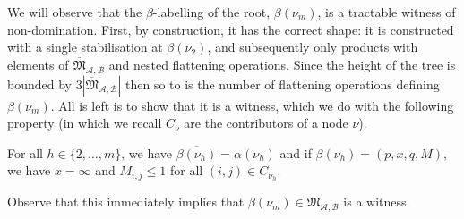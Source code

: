 \documentclass{lmcs}
\theoremstyle{remark}
\newcommand{\ideal}{\mathfrak{M}}
\newcommand{\autA}{\mathcal{A}}
\newcommand{\autB}{\mathcal{B}}
\theoremstyle{remark}
\begin{document}
We will observe that the $\beta$-labelling of the root, $\beta(\nu_m)$, is a tractable witness of non-domination. First, by construction, it has the correct shape: it is constructed with a single stabilisation at $\beta(\nu_2)$, and subsequently only products with elements of $\overline{\ideal}_{\autA,\autB}$ and nested flattening operations. Since the height of the tree is bounded by $3|\overline{\ideal}_{\autA,\autB}|$ then so to is the number of flattening operations defining $\beta(\nu_m)$. All is left is to show that it is a witness, which we do with the following property (in which we recall $C_{\nu}$ are the contributors of a node $\nu$).

\begin{prop}
\label{lemma:betanumiswitness}
For all $h\in\{2,\dots,m\}$, we have $\overline{\beta(\nu_h)} = \alpha(\nu_h)$ and if $\beta(\nu_h)= (p,x,q,M)$, we have $x=\infty$ and $M_{i,j} \le 1$ for all $(i,j) \in C_{\nu_h}$.
\end{prop}

Observe that this immediately implies that $\beta(\nu_m) \in \ideal_{\autA,\autB}$ is a witness.
\end{document}
